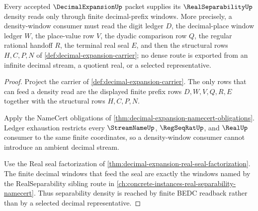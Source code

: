 \begin{theorem}
\label{thm:decimal-expansion-separability-density-obligation}
Every accepted $\DecimalExpansionUp$ packet supplies its $\RealSeparabilityUp$ density reads only through finite decimal-prefix windows. More precisely, a density-window consumer must read the digit ledger $D$, the decimal-place window ledger $W$, the place-value row $V$, the dyadic comparison row $Q$, the regular rational handoff $R$, the terminal real seal $E$, and then the structural rows $H,C,P,N$ of \autoref{def:decimal-expansion-carrier}; no dense route is exported from an infinite decimal stream, a quotient real, or a selected representative.
\end{theorem}
\begin{proof}
Project the carrier of \autoref{def:decimal-expansion-carrier}. The only rows that can feed a density read are the displayed finite prefix rows $D,W,V,Q,R,E$ together with the structural rows $H,C,P,N$.

Apply the NameCert obligations of \autoref{thm:decimal-expansion-namecert-obligations}. Ledger exhaustion restricts every $\StreamNameUp$, $\RegSeqRatUp$, and $\RealUp$ consumer to the same finite coordinates, so a density-window consumer cannot introduce an ambient decimal stream.

Use the Real seal factorization of \autoref{thm:decimal-expansion-real-seal-factorization}. The finite decimal windows that feed the seal are exactly the windows named by the RealSeparability sibling route in \autoref{ch:concrete-instances-real-separability-namecert}. Thus separability density is reached by finite BEDC readback rather than by a selected decimal representative.
\end{proof}


